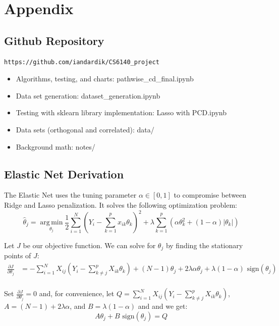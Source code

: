 \documentclass[11pt]{article}
\newcommand{\thh}{\hat{\theta}}
\newcommand{\sgn}{\text{ sign}}
\DeclareMathOperator*{\argmin}{arg\,min}
\begin{document}
\section{Appendix}

\subsection{Github Repository}
\begin{verbatim}
https://github.com/iandardik/CS6140_project
\end{verbatim}
\begin{itemize}
	\item Algorithms, testing, and charts: pathwise\_cd\_final.ipynb
	\item Data set generation: dataset\_generation.ipynb
	\item Testing with sklearn library implementation: Lasso with PCD.ipynb
	\item Data sets (orthogonal and correlated): data/
	\item Background math: notes/
\end{itemize}

\subsection{Elastic Net Derivation}
\label{enderiv}
The Elastic Net uses the tuning parameter $\alpha \in [0,1]$ to compromise between Ridge and Lasso penalization.  It solves the following optimization problem:
	$$\thh_j = \argmin\limits_{\theta_j} \frac{1}{2} \sum\limits_{i=1}^N \left(Y_i - \sum\limits_{k=1}^px_{ik}\theta_k \right)^2 + \lambda \sum\limits_{k=1}^p\left(\alpha\theta_k^2 + (1-\alpha)|\theta_k| \right)$$

Let $J$ be our objective function.  We can solve for $\theta_j$ by finding the stationary points of $J$:
\begin{equation}\begin{split}
	\frac{\partial J}{\partial \theta_j}
		& = -\sum\limits_{i=1}^N X_{ij}(Y_i - \sum\limits_{k \ne j}^p X_{ik}\theta_k) +(N-1)\theta_j + 2\lambda\alpha\theta_j + \lambda(1-\alpha)\sgn(\theta_j) \\
\end{split}\end{equation}

Set $\frac{\partial J}{\partial \theta_j}=0$ and, for convenience, let $Q = \sum\limits_{i=1}^N X_{ij}(Y_i - \sum\limits_{k \ne j}^p X_{ik}\theta_k)$, $A=(N-1)+2\lambda\alpha$, and $B=\lambda(1-\alpha)$ and and we get:
	$$A\theta_j + B\sgn(\theta_j) = Q$$
\end{document}
